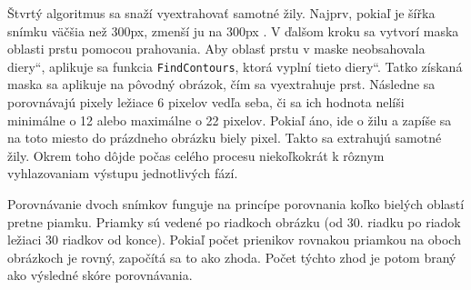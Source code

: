\documentclass[11pt,a4paper]{article}
\newcommand{\uva}[1]{\quotedblbase #1\textquotedblleft}
\begin{document}
Štvrtý algoritmus sa snaží vyextrahovať samotné žily. Najprv, pokiaľ je šířka
snímku väčšia než 300px, zmenší ju na 300px \cite{mahri}. V ďalšom kroku sa
vytvorí maska oblasti prstu pomocou prahovania. Aby oblasť prstu v maske
neobsahovala \uva{diery}, aplikuje sa funkcia \texttt{FindContours}, ktorá
vyplní tieto \uva{diery}.  Tatko získaná maska sa aplikuje na pôvodný obrázok,
čím sa vyextrahuje prst.
Následne sa porovnávajú pixely ležiace 6 pixelov vedľa seba, či sa ich
hodnota nelíši minimálne o 12 alebo maximálne o 22 pixelov. Pokiaľ áno, ide o žilu
a zapíše sa na toto miesto do prázdneho obrázku biely pixel. Takto sa extrahujú
samotné žily. Okrem toho dôjde počas celého procesu niekoľkokrát k rôznym
vyhlazovaniam výstupu jednotlivých fází.

Porovnávanie dvoch snímkov funguje na princípe porovnania koľko bielých oblastí pretne
piamku. Priamky sú vedené po riadkoch obrázku (od 30. riadku po riadok ležiaci
30 riadkov od konce). Pokiaľ počet prienikov rovnakou priamkou na oboch obrázkoch je
rovný, započítá sa to ako zhoda. Počet týchto zhod je potom braný ako výsledné
skóre porovnávania.
\end{document}
